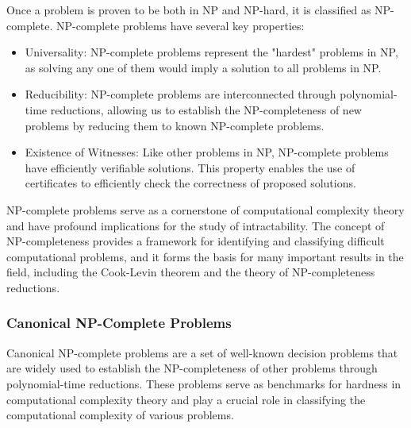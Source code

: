 \documentclass[12pt]{book} %
\begin{document}
Once a problem is proven to be both in NP and NP-hard, it is classified as NP-complete. NP-complete problems have several key properties:
\begin{itemize}
    \item Universality: NP-complete problems represent the "hardest" problems in NP, as solving any one of them would imply a solution to all problems in NP.

\item Reducibility: NP-complete problems are interconnected through polynomial-time reductions, allowing us to establish the NP-completeness of new problems by reducing them to known NP-complete problems.

\item Existence of Witnesses: Like other problems in NP, NP-complete problems have efficiently verifiable solutions. This property enables the use of certificates to efficiently check the correctness of proposed solutions.

\end{itemize}

NP-complete problems serve as a cornerstone of computational complexity theory and have profound implications for the study of intractability. The concept of NP-completeness provides a framework for identifying and classifying difficult computational problems, and it forms the basis for many important results in the field, including the Cook-Levin theorem and the theory of NP-completeness reductions.


\subsubsection{Canonical NP-Complete Problems}

Canonical NP-complete problems are a set of well-known decision problems that are widely used to establish the NP-completeness of other problems through polynomial-time reductions. These problems serve as benchmarks for hardness in computational complexity theory and play a crucial role in classifying the computational complexity of various problems.
\end{document}
